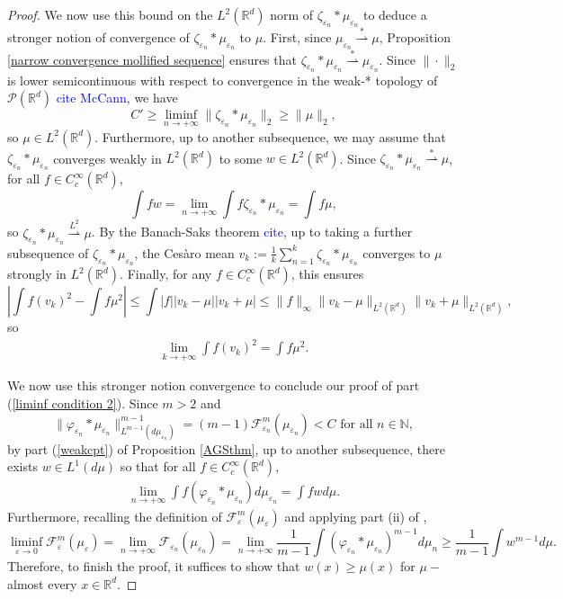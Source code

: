 \documentclass[11pt,leqno]{amsart}
\theoremstyle{definition}
\newcommand{\Rd}{{\mathord{\mathbb R}^d}}
\newcommand{\wsto}{\stackrel{*}{\rightharpoonup}}
\newcommand{\F}{\mathcal{F}}
\def\P{{\mathcal P}}
\def\e{\varepsilon}
\def\F{\mathcal{F}}
\begin{document}
\begin{proof}
We now use this bound on the $L^2(\Rd)$ norm of $\zeta_{\e_n}*\mu_{\e_n}$ to deduce a stronger notion of convergence of $\zeta_{\e_n}*\mu_{\e_n}$ to $\mu$. First, since $\mu_{\e_n} \wsto \mu$,  Proposition \ref{narrow convergence mollified sequence} ensures that $\zeta_{\e_n}*\mu_{\e_n} \wsto \mu_{\e_n}$.
Since $\|\cdot \|_2$ is lower semicontinuous with respect to convergence in the weak-* topology of $\P(\Rd)$ \textcolor{blue}{cite McCann}, we have
\[ C' \geq \liminf_{n \to +\infty} \|\zeta_{\e_n}*\mu_{\e_n}\|_2 \geq \|\mu\|_2 ,\]
so $\mu \in L^2(\Rd)$. Furthermore, up to another subsequence, we may assume that $\zeta_{\e_n}*\mu_{\e_n}$ converges weakly in $L^2(\Rd)$ to some $w \in L^2(\Rd)$. Since $\zeta_{\e_n}*\mu_{\e_n} \wsto \mu$, for all $f \in C^\infty_c(\Rd)$,
\[ \int f w = \lim_{n \to +\infty} \int f \zeta_{\e_n}*\mu_{\e_n} = \int f \mu ,\]
so $\zeta_{\e_n}*\mu_{\e_n} \stackrel{L^2}{\rightharpoonup} \mu$. By the Banach-Saks theorem \textcolor{blue}{cite}, up to taking a further subsequence of $\zeta_{\e_n}*\mu_{\e_n}$, the Ces\`aro mean $v_k := \frac{1}{k} \sum_{n=1}^k \zeta_{\e_n}*\mu_{\e_n}$ converges to $\mu$ strongly in $L^2(\Rd)$. Finally, for any $f \in C^\infty_c(\Rd)$, this ensures
 \[ \left| \int f (v_k)^2 - \int f \mu^2 \right| \leq \int |f| |v_k-\mu||v_k +\mu| \leq  \|f\|_\infty  \|v_k -\mu\|_{L^2(\Rd)} \|v_k + \mu\|_{L^2(\Rd)},\]
 so 
 \begin{align} \label{dist conv of square} 
 \lim_{k \to +\infty} \int f (v_k)^2 = \int f \mu^2 .
 \end{align}
 
 We now use this stronger notion convergence to conclude our proof of part (\ref{liminf condition 2}). Since $m>2$ and 
 \[  \| \varphi_{\e_n} * \mu_{\e_n} \|_{L^{m-1}(d \mu_{\e_n})}^{m-1} = (m-1) \F^m_{\e_n}(\mu_{\e_n})  < C \text{ for all } n \in \mathbb{N}, \]
by part (\ref{weakcpt}) of Proposition \ref{AGSthm}, up to another subsequence,  there exists $w \in L^1(d\mu)$ so that for all $f \in C^\infty_c(\Rd)$,
 \begin{align} \lim_{n \to +\infty} \int f (\varphi_{\e_n} * \mu_{\e_n}) d \mu_{\e_n} = \int f w d \mu . \label{weak conv prob}
 \end{align}
 Furthermore, recalling the definition of $\mathcal{F}^m_\e(\mu_\e)$ and applying part (ii) of \cite[Theorem 5.4.4]{AGS},
 \[ \liminf_{\e \to 0} \mathcal{F}^m_\e(\mu_\e) = \lim_{n \to +\infty} \mathcal{F}_{\e_n}(\mu_{\e_n}) = \lim_{n \to +\infty} \frac{1}{m-1} \int (\varphi_{\e_n}*\mu_{\e_n})^{m-1} d \mu_n  \geq \frac{1}{m-1} \int w^{m-1} d\mu . \]
 Therefore, to finish the proof, it suffices to show that $w(x) \geq \mu(x)$ for $\mu-$almost every $x \in \Rd$.


\end{proof}
\end{document}
